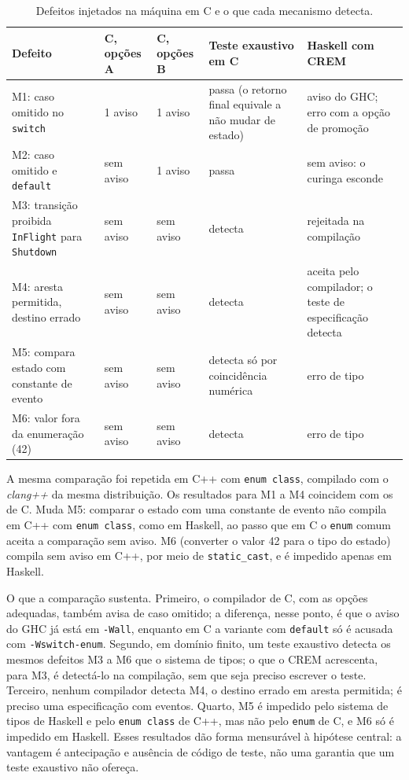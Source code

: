 \documentclass[12pt,a4paper]{article}
\begin{document}
\begin{table}[h]
\centering
\scriptsize
\begin{tabular}{|p{3.4cm}|p{1.6cm}|p{1.6cm}|p{2.2cm}|p{4.3cm}|}
\hline
Defeito & C, opções A & C, opções B & Teste exaustivo em C & Haskell com CREM \\
\hline
M1: caso omitido no \texttt{switch} & 1 aviso & 1 aviso & passa (o retorno final equivale a não mudar de estado) & aviso do GHC; erro com a opção de promoção \\
\hline
M2: caso omitido e \texttt{default} & sem aviso & 1 aviso & passa & sem aviso: o curinga esconde \\
\hline
M3: transição proibida \texttt{InFlight} para \texttt{Shutdown} & sem aviso & sem aviso & detecta & rejeitada na compilação \\
\hline
M4: aresta permitida, destino errado & sem aviso & sem aviso & detecta & aceita pelo compilador; o teste de especificação detecta \\
\hline
M5: compara estado com constante de evento & sem aviso & sem aviso & detecta só por coincidência numérica & erro de tipo \\
\hline
M6: valor fora da enumeração (42) & sem aviso & sem aviso & detecta & erro de tipo \\
\hline
\end{tabular}
\caption{Defeitos injetados na máquina em C e o que cada mecanismo detecta.}
\end{table}

A mesma comparação foi repetida em C++ com \texttt{enum class}, compilado com o \textit{clang++} da mesma distribuição. Os resultados para M1 a M4 coincidem com os de C. Muda M5: comparar o estado com uma constante de evento não compila em C++ com \texttt{enum class}, como em Haskell, ao passo que em C o \texttt{enum} comum aceita a comparação sem aviso. M6 (converter o valor 42 para o tipo do estado) compila sem aviso em C++, por meio de \texttt{static\_cast}, e é impedido apenas em Haskell.

O que a comparação sustenta. Primeiro, o compilador de C, com as opções adequadas, também avisa de caso omitido; a diferença, nesse ponto, é que o aviso do GHC já está em \texttt{-Wall}, enquanto em C a variante com \texttt{default} só é acusada com \texttt{-Wswitch-enum}. Segundo, em domínio finito, um teste exaustivo detecta os mesmos defeitos M3 a M6 que o sistema de tipos; o que o CREM acrescenta, para M3, é detectá-lo na compilação, sem que seja preciso escrever o teste. Terceiro, nenhum compilador detecta M4, o destino errado em aresta permitida; é preciso uma especificação com eventos. Quarto, M5 é impedido pelo sistema de tipos de Haskell e pelo \texttt{enum class} de C++, mas não pelo \texttt{enum} de C, e M6 só é impedido em Haskell. Esses resultados dão forma mensurável à hipótese central: a vantagem é antecipação e ausência de código de teste, não uma garantia que um teste exaustivo não ofereça.
\end{document}
